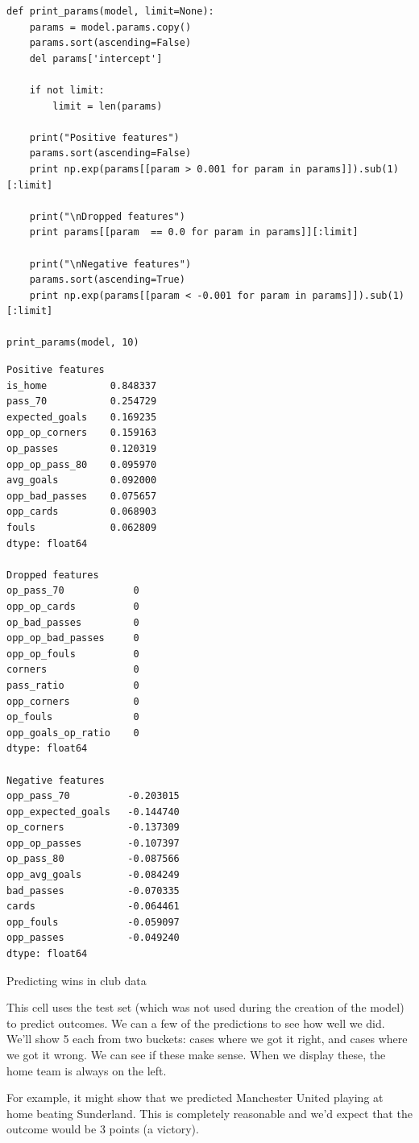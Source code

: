 \documentclass[12pt,fleqn]{article}\usepackage{../common}
\begin{document}
\begin{verbatim}
def print_params(model, limit=None):    
    params = model.params.copy()
    params.sort(ascending=False)
    del params['intercept']
    
    if not limit:
        limit = len(params)

    print("Positive features")
    params.sort(ascending=False)
    print np.exp(params[[param > 0.001 for param in params]]).sub(1)[:limit]

    print("\nDropped features")
    print params[[param  == 0.0 for param in params]][:limit]

    print("\nNegative features")
    params.sort(ascending=True)
    print np.exp(params[[param < -0.001 for param in params]]).sub(1)[:limit]

print_params(model, 10)
\end{verbatim}

\begin{verbatim}
Positive features
is_home           0.848337
pass_70           0.254729
expected_goals    0.169235
opp_op_corners    0.159163
op_passes         0.120319
opp_op_pass_80    0.095970
avg_goals         0.092000
opp_bad_passes    0.075657
opp_cards         0.068903
fouls             0.062809
dtype: float64

Dropped features
op_pass_70            0
opp_op_cards          0
op_bad_passes         0
opp_op_bad_passes     0
opp_op_fouls          0
corners               0
pass_ratio            0
opp_corners           0
op_fouls              0
opp_goals_op_ratio    0
dtype: float64

Negative features
opp_pass_70          -0.203015
opp_expected_goals   -0.144740
op_corners           -0.137309
opp_op_passes        -0.107397
op_pass_80           -0.087566
opp_avg_goals        -0.084249
bad_passes           -0.070335
cards                -0.064461
opp_fouls            -0.059097
opp_passes           -0.049240
dtype: float64
\end{verbatim}

Predicting wins in club data

This cell uses the test set (which was not used during the creation of the
model) to predict outcomes. We can a few of the predictions to see how well
we did. We'll show 5 each from two buckets: cases where we got it right,
and cases where we got it wrong. We can see if these make sense. When we
display these, the home team is always on the left.

For example, it might show that we predicted Manchester United playing at
home beating Sunderland. This is completely reasonable and we'd expect that
the outcome would be 3 points (a victory).
\end{document}
